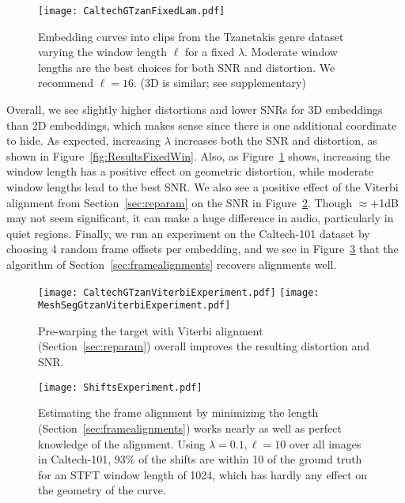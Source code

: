 \documentclass[runningheads]{llncs}
\begin{document}
\begin{figure}
  \centering
  \texttt{[image: CaltechGTzanFixedLam.pdf]}
  \caption{Embedding curves into clips from the Tzanetakis genre dataset varying the window length $\ell$ for a fixed $\lambda$.  Moderate window lengths are the best choices for both SNR and distortion.  We recommend $\ell=16$. (3D is similar; see supplementary)}
  \label{fig:ResultsFixedLam}
\end{figure}

Overall, we see slightly higher distortions and lower SNRs for 3D embeddings than 2D embeddings, which makes sense since there is one additional coordinate to hide.  As expected, increasing $\lambda$ increases both the SNR and distortion, as shown in Figure~\ref{fig:ResultsFixedWin}. Also, as Figure~\ref{fig:ResultsFixedLam} shows, increasing the window length has a positive effect on geometric distortion, while moderate window lengths lead to the best SNR.  We also see a positive effect of the Viterbi alignment from Section~\ref{sec:reparam} on the SNR in Figure~\ref{fig:ResultsViterbiExperiment}.  Though $\approx$+1dB may not seem significant, it can make a huge difference in audio, particularly in quiet regions.  Finally, we run an experiment on the Caltech-101 dataset by choosing 4 random frame offsets per embedding, and we see in Figure~\ref{fig:ShiftsExperiment} that the algorithm of Section~\ref{sec:framealignments} recovers alignments well.  


\begin{figure}
  \centering
  \texttt{[image: CaltechGTzanViterbiExperiment.pdf]}
  \texttt{[image: MeshSegGtzanViterbiExperiment.pdf]}
  \caption{Pre-warping the target with Viterbi alignment (Section~\ref{sec:reparam}) overall improves the resulting distortion and SNR.}
  \label{fig:ResultsViterbiExperiment}
\end{figure}

\begin{figure}
  \centering
  \texttt{[image: ShiftsExperiment.pdf]}
  \caption{Estimating the frame alignment by minimizing the length (Section~\ref{sec:framealignments}) works nearly as well as perfect knowledge of the alignment. Using $\lambda=0.1, \ell=10$ over all images in Caltech-101, 93\% of the shifts are within 10 of the ground truth for an STFT window length of 1024, which has hardly any effect on the geometry of the curve.}
  \label{fig:ShiftsExperiment}
\end{figure}
\end{document}
